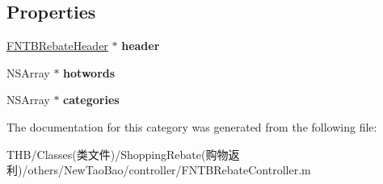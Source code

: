 \subsection*{Properties}
\begin{DoxyCompactItemize}
\item 
\mbox{\label{category_f_n_t_b_rebate_controller_07_08_aca7525bfcc43aab1ada39bec7e7b653b}} 
\mbox{\hyperlink{interface_f_n_t_b_rebate_header}{F\+N\+T\+B\+Rebate\+Header}} $\ast$ {\bfseries header}
\item 
\mbox{\label{category_f_n_t_b_rebate_controller_07_08_aad3a097fa1a73f28c1126feca4b2e938}} 
N\+S\+Array $\ast$ {\bfseries hotwords}
\item 
\mbox{\label{category_f_n_t_b_rebate_controller_07_08_a2613628b34f7ca02b8a785b105cc7875}} 
N\+S\+Array $\ast$ {\bfseries categories}
\end{DoxyCompactItemize}


The documentation for this category was generated from the following file\+:\begin{DoxyCompactItemize}
\item 
T\+H\+B/\+Classes(类文件)/\+Shopping\+Rebate(购物返利)/others/\+New\+Tao\+Bao/controller/F\+N\+T\+B\+Rebate\+Controller.\+m\end{DoxyCompactItemize}
